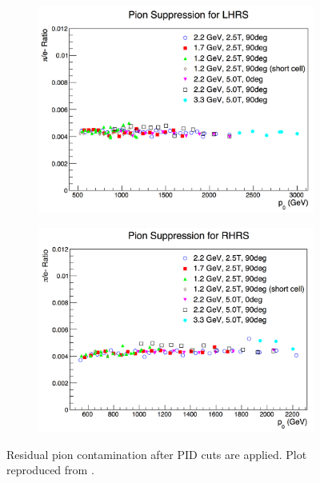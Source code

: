 \begin{figure}[tb!]
  \centering
  \begin{subfigure}[t]{0.49\textwidth}
    \includegraphics[width=\textwidth]{figs/pion-suppression-left.png}
  \end{subfigure}
  \begin{subfigure}[t]{0.49\textwidth}
    \includegraphics[width=\textwidth]{figs/pion-suppression-right.png}
  \end{subfigure}
  \caption[Residual pion contamination after PID cuts are applied.]{Residual pion contamination after PID cuts are applied. Plot reproduced from \cite{Cummings2013}. \label{C7S2SS2F3}}
\end{figure}

